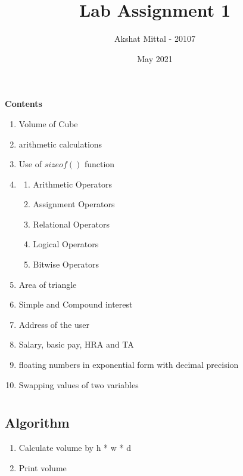 \documentclass[12pt]{article}
\title{Lab Assignment 1}
\author{Akshat Mittal - 20107}
\date{May 2021}
\begin{document}
\maketitle
\vspace{7mm}
\textbf{Contents}
\vspace{7mm}
\begin{enumerate}
    \item Volume of Cube
    \item arithmetic calculations
    \item Use of $sizeof()$ function
    \item 
        \begin{enumerate}
            \item Arithmetic Operators
            \item Assignment Operators
            \item Relational Operators
            \item Logical Operators
            \item Bitwise Operators
        \end{enumerate}
    \item Area of triangle
    \item Simple and Compound interest
    \item Address of the user
    \item Salary, basic pay, HRA and TA
    \item floating numbers in exponential form with decimal precision
    \item Swapping values of two variables
\end{enumerate}
\newpage
\section{}
\subsection{Algorithm}
\begin{enumerate}
    \item Calculate volume by h * w * d
    \item Print volume
\end{enumerate}
\end{document}
